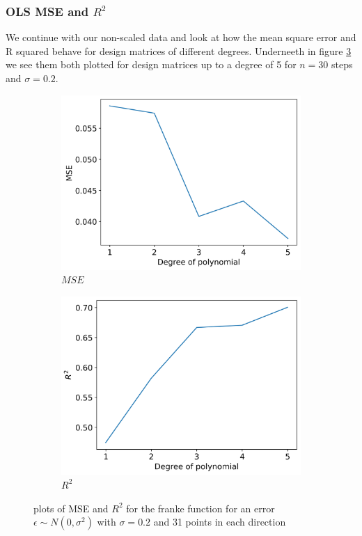 \documentclass[12pt]{article}
\begin{document}
\subsubsection{OLS MSE and $R^2$}

We continue with our non-scaled data and look at how the mean square error and R squared behave for design matrices of different degrees. Underneeth in figure \ref{fig:r2_mse_5} we see them both plotted for design matrices up to a degree of 5 for $n=30$ steps and $\sigma=0.2$.
\begin{figure}[H]
  \begin{subfigure}{.5\textwidth}
    \centering
    \includegraphics[width=\textwidth]{../figures/mse_ols_5.png}
    \caption{$MSE$}
    \label{fig:}
  \end{subfigure}
  \begin{subfigure}{.5\textwidth}
    \centering
    \includegraphics[width=\textwidth]{../figures/r2_ols_5.png}
    \caption{$R^2$}
    \label{fig:}
  \end{subfigure}
  \caption{plots of MSE and $R^2$ for the franke function for an error $\epsilon \sim N(0, \sigma^2)$ with $\sigma=0.2$ and 31 points in each direction}
  \label{fig:r2_mse_5}
\end{figure}
\end{document}
